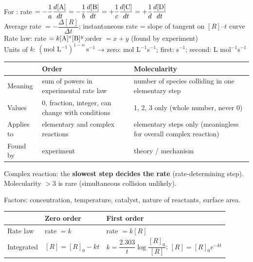 \documentclass[9pt,a4paper]{extarticle}
\begin{document}
\begin{multicols}{2}
\begin{kbox}
For : \;rate $=-\dfrac1a\dfrac{d[\ce A]}{dt}=-\dfrac1b\dfrac{d[\ce B]}{dt}=+\dfrac1c\dfrac{d[\ce C]}{dt}=+\dfrac1d\dfrac{d[\ce D]}{dt}$\\[2pt]
Average rate $=-\dfrac{\Delta[R]}{\Delta t}$; instantaneous rate = slope of tangent on $[R]$--$t$ curve\\[2pt]
Rate law: rate $=k[\ce A]^x[\ce B]^y$;\quad order $=x+y$ (found by experiment)\\[2pt]
Units of $k$: $(\text{mol L}^{-1})^{1-n}\,\text{s}^{-1}$ → zero: mol L$^{-1}$s$^{-1}$; first: s$^{-1}$; second: L mol$^{-1}$s$^{-1}$
\end{kbox}
{\scriptsize\begin{tabularx}{\linewidth}{@{}l@{\ }Y@{\ }Y@{}}
\toprule
 & \textbf{Order} & \textbf{Molecularity}\\
\midrule
Meaning & sum of powers in experimental rate law & number of species colliding in one elementary step\\
Values & 0, fraction, integer, can change with conditions & 1, 2, 3 only (whole number, never 0)\\
Applies to & elementary and complex reactions & elementary steps only (meaningless for overall complex reaction)\\
Found by & experiment & theory / mechanism\\
\bottomrule
\end{tabularx}\par}
\vspace{2pt}
\begin{fl}
\item Complex reaction: the \textbf{slowest step decides the rate} (rate-determining step). Molecularity $>3$ is rare (simultaneous collision unlikely).
\item Factors: concentration, temperature, catalyst, nature of reactants, surface area.
\end{fl}
{\scriptsize\begin{tabularx}{\linewidth}{@{}l@{\ }Y@{\ }Y@{}}
\toprule
 & \textbf{Zero order} & \textbf{First order}\\
\midrule
Rate law & rate $=k$ & rate $=k[R]$\\
Integrated & $[R]=[R]_0-kt$ & $k=\dfrac{2.303}{t}\log\dfrac{[R]_0}{[R]}$;\; $[R]=[R]_0e^{-kt}$\\[3pt]

\end{tabularx}}
\end{multicols}
\end{document}

